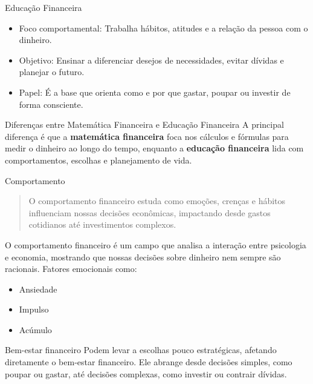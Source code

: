 \documentclass{if-beamer}
\begin{document}
	\begin{frame}{Educação Financeira}
		\begin{itemize}
			\item Foco comportamental: Trabalha hábitos, atitudes e a relação da pessoa com o dinheiro.
			\item Objetivo: Ensinar a diferenciar desejos de necessidades, evitar dívidas e planejar o futuro.				\item Papel: É a base que orienta como e por que gastar, poupar ou investir de forma consciente.
		\end{itemize}
	\end{frame}
	
	\begin{frame}{Diferenças entre Matemática Financeira e Educação Financeira}
		A principal diferença é que a \textbf{matemática financeira} foca nos cálculos e fórmulas para medir o dinheiro ao longo do tempo, enquanto a \textbf{educação financeira} lida com comportamentos, escolhas e planejamento de vida.		
	\end{frame}

	\begin{frame}[allowframebreaks]{Comportamento}
		\begin{quote}
			O comportamento financeiro estuda como emoções, crenças e hábitos influenciam nossas decisões econômicas, impactando desde gastos cotidianos até investimentos complexos.
		\end{quote}
		
		\framebreak

		O comportamento financeiro é um campo que analisa a interação entre psicologia e economia, mostrando que nossas decisões sobre dinheiro nem sempre são racionais. Fatores emocionais como:

		 \begin{itemize}
			\item Ansiedade
			\item Impulso
			\item Acúmulo
		 \end{itemize}

	\framebreak
	
		\begin{block}{Bem-estar financeiro}
			Podem levar a escolhas pouco estratégicas, afetando diretamente o bem-estar financeiro. Ele abrange desde decisões simples, como poupar ou gastar, 	até decisões complexas, como investir ou contrair dívidas.
		\end{block}
	\end{frame}
\end{document}
